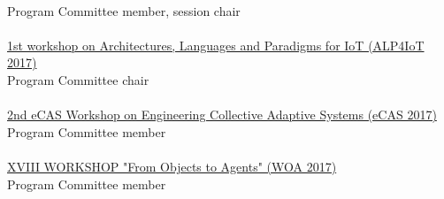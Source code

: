 \\ Program Committee member, session chair \\
\halfblankline \\
\href{http://apice.unibo.it/xwiki/bin/view/ALP4IoT2016/WebHome}{1st workshop on Architectures, Languages and Paradigms for IoT (ALP4IoT 2017)}
\\ Program Committee chair \\
\halfblankline \\
\href{http://apice.unibo.it/xwiki/bin/view/ECAS2017/WebHome}{2nd eCAS Workshop on Engineering Collective Adaptive Systems (eCAS 2017)}
\\ Program Committee member \\
\halfblankline \\
\href{http://woa2017.unirc.it/}{XVIII WORKSHOP "From Objects to Agents" (WOA 2017)}
\\ Program Committee member \\
